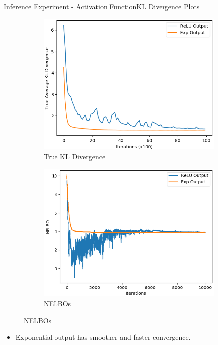 \documentclass{beamer}
\begin{document}
\begin{frame}{Inference Experiment - Activation Function}{KL Divergence Plots}
\begin{figure}
\begin{subfigure}{0.49\textwidth}
\includegraphics[width=\linewidth]{truklmins/PCKLvsPCKLEXP.png}
\caption{True KL Divergence}
\end{subfigure}
\begin{subfigure}{0.49\textwidth}
\includegraphics[width=\linewidth]{nelbos/PCKLvsPCKLEXP.png}
\caption{NELBOs}
\end{subfigure}
\end{figure}
\begin{itemize}
\item Exponential output has smoother and faster convergence.
\end{itemize}
\end{frame}
\end{document}

